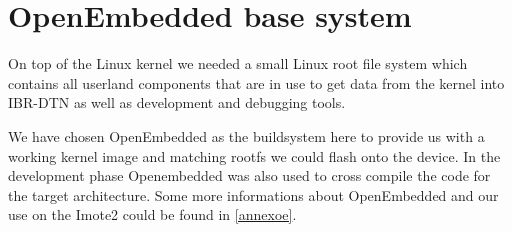 \section{OpenEmbedded base system}
On top of the Linux kernel we needed a small Linux root file system which
contains all userland components that are in use to get data from the kernel
into IBR-DTN as well as development and debugging tools.

We have chosen OpenEmbedded as the buildsystem here to provide us with a working
kernel image and matching rootfs we could flash onto the device. In the
development phase Openembedded was also used to cross compile the code for the
target architecture. Some more informations about OpenEmbedded and our use on the
Imote2 could be found in \ref{annexoe}.
